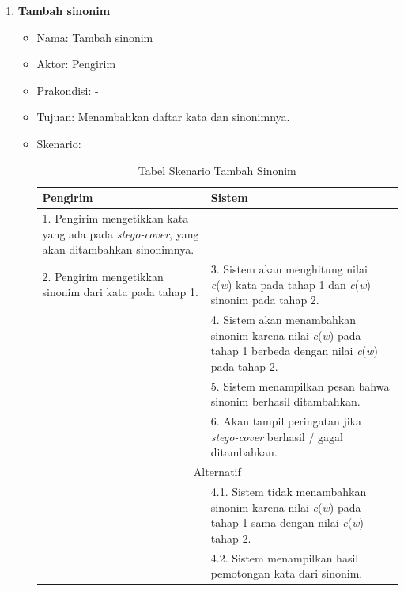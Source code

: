 \begin{enumerate}
	\item \textbf{Tambah sinonim}
	\begin{itemize}
		\item Nama: Tambah sinonim
		\item Aktor: Pengirim
		\item Prakondisi: -
		\item Tujuan: Menambahkan daftar kata dan sinonimnya.
		\item Skenario:
		\begin{table}[H]
		\centering
		\caption{Tabel Skenario Tambah Sinonim}
		\begin{tabular}{| p{6.5cm} | p{6.5cm} |}\hline
		Pengirim & Sistem \\
		\hline
				1. Pengirim mengetikkan kata yang ada pada \textit{stego-cover}, yang akan ditambahkan sinonimnya. & \\
				\hline
				2. Pengirim mengetikkan sinonim dari kata pada tahap 1. & 3. Sistem akan menghitung nilai \textit{c}(\textit{w}) kata pada tahap 1 dan \textit{c}(\textit{w}) sinonim pada tahap 2. \\
				\hline
				& 4. Sistem akan menambahkan sinonim karena nilai \textit{c}(\textit{w}) pada tahap 1 berbeda dengan nilai \textit{c}(\textit{w}) pada tahap 2. \\
				\hline
				& 5. Sistem menampilkan pesan bahwa sinonim berhasil ditambahkan. \\
				\hline
				& 6. Akan tampil peringatan jika \textit{stego-cover} berhasil / gagal ditambahkan. \\
				\hline
				\hline
				\multicolumn{2}{|c|}{Alternatif}\\
				\hline
				& 4.1. Sistem tidak menambahkan sinonim karena nilai \textit{c}(\textit{w}) pada tahap 1 sama dengan nilai \textit{c}(\textit{w}) tahap 2. \\
				\hline
				& 4.2. Sistem menampilkan hasil pemotongan kata dari sinonim. \\
		\hline
		\end{tabular}
		\end{table}
	\end{itemize}
	

\end{enumerate}
